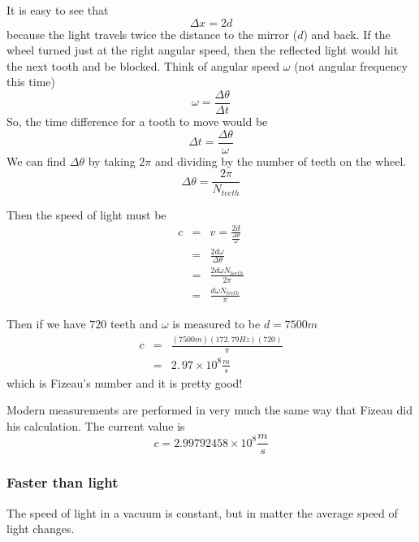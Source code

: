 \documentclass{article}
\begin{document}
It is easy to see that 
\[
\Delta x=2d
\]%
because the light travels twice the distance to the mirror ($d$) and back.
If the wheel turned just at the right angular speed, then the reflected
light would hit the next tooth and be blocked. Think of angular speed $%
\omega $ (not angular frequency this time)%
\[
\omega =\frac{\Delta \theta }{\Delta t}
\]%
So, the time difference for a tooth to move would be 
\[
\Delta t=\frac{\Delta \theta }{\omega }
\]%
We can find $\Delta \theta $ by taking $2\pi $ and dividing by the number of
teeth on the wheel.%
\[
\Delta \theta =\frac{2\pi }{N_{teeth}}
\]

Then the speed of light must be 
\begin{eqnarray*}
c &=&v=\frac{2d}{\frac{\Delta \theta }{\omega }} \\
&=&\frac{2d\omega }{\Delta \theta } \\
&=&\frac{2d\omega N_{teeth}}{2\pi } \\
&=&\frac{d\omega N_{teeth}}{\pi }
\end{eqnarray*}

Then if we have $720$ teeth and $\omega $ is measured to be $d=7500\unit{m}$%
\begin{eqnarray*}
c &=&\frac{\left( 7500\unit{m}\right) \left( 172.\,\allowbreak 79\unit{Hz}%
\right) \left( 720\right) }{\pi } \\
&=&2.\,\allowbreak 97\times 10^{8}\frac{\unit{m}}{\unit{s}}
\end{eqnarray*}%
which is Fizeau's number and it is pretty good!

Modern measurements are performed in very much the same way that Fizeau did
his calculation. The current value is 
\begin{equation}
c=2.99792458\times 10^{8}\frac{\unit{m}}{\unit{s}}
\end{equation}

\subsubsection{Faster than light}

The speed of light in a vacuum is constant, but in matter the average speed
of light changes.
\end{document}
